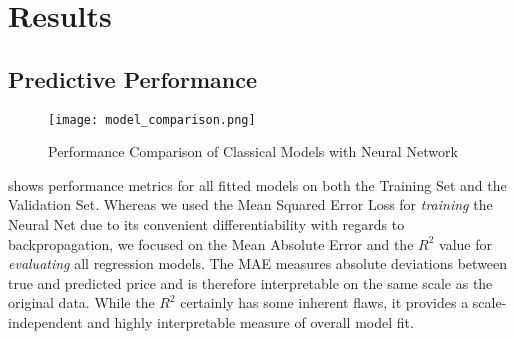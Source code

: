 \section{Results} \label{results}




\subsection{Predictive Performance}

\begin{figure}[t]
  \centering
  \texttt{[image: model\_comparison.png]}
  \caption{Performance Comparison of Classical Models with Neural Network}
  \label{fig:model-comparison}
\end{figure}

 shows performance metrics for all fitted models on both the Training Set and the Validation Set.
Whereas we used the Mean Squared Error Loss for \emph{training} the Neural Net due to its convenient differentiability with regards to backpropagation, we focused on the Mean Absolute Error and the $R^2$ value for \emph{evaluating} all regression models.
The MAE measures absolute deviations between true and predicted price and is therefore interpretable on the same scale as the original data.
While the $R^2$ certainly has some inherent flaws, it provides a scale-independent and highly interpretable measure of overall model fit.


